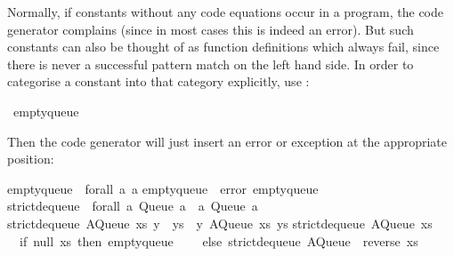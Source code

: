 \begin{isabellebody}
\begin{isamarkuptext}
  Normally, if constants without any code equations occur in a
  program, the code generator complains (since in most cases this is
  indeed an error).  But such constants can also be thought
  of as function definitions which always fail,
  since there is never a successful pattern match on the left hand
  side.  In order to categorise a constant into that category
  explicitly, use \hypertarget{command.code-abort}{\hyperlink{command.code-abort}{\mbox{}}}:%
\end{isamarkuptext}%
\isamarkuptrue%
%
\isadelimquote
%
\endisadelimquote
%
\isatagquote
{}\isamarkupfalse%
\ empty{\isacharunderscore}queue%
\endisatagquote
{\isafoldquote}%
%
\isadelimquote
%
\endisadelimquote
%
\begin{isamarkuptext}%
\noindent Then the code generator will just insert an error or
  exception at the appropriate position:%
\end{isamarkuptext}%
\isamarkuptrue%
%
\isadelimtypewriter
%
\endisadelimtypewriter
%
\isatagtypewriter
%
\begin{isamarkuptext}%
empty{\isacharunderscore}queue\ {\isacharcolon}{\isacharcolon}\ forall\ a{\isachardot}\ a{\isacharsemicolon}\isanewline
empty{\isacharunderscore}queue\ {\isacharequal}\ error\ {\isachardoublequote}empty{\isacharunderscore}queue{\isachardoublequote}{\isacharsemicolon}\isanewline
\isanewline
strict{\isacharunderscore}dequeue\ {\isacharcolon}{\isacharcolon}\ forall\ a{\isachardot}\ Queue\ a\ {\isacharminus}{\isachargreater}\ {\isacharparenleft}a{\isacharcomma}\ Queue\ a{\isacharparenright}{\isacharsemicolon}\isanewline
strict{\isacharunderscore}dequeue\ {\isacharparenleft}AQueue\ xs\ {\isacharparenleft}y\ {\isacharcolon}\ ys{\isacharparenright}{\isacharparenright}\ {\isacharequal}\ {\isacharparenleft}y{\isacharcomma}\ AQueue\ xs\ ys{\isacharparenright}{\isacharsemicolon}\isanewline
strict{\isacharunderscore}dequeue\ {\isacharparenleft}AQueue\ xs\ {\isacharbrackleft}{\isacharbrackright}{\isacharparenright}\ {\isacharequal}\isanewline
\ \ {\isacharparenleft}if\ null\ xs\ then\ empty{\isacharunderscore}queue\isanewline
\ \ \ \ else\ strict{\isacharunderscore}dequeue\ {\isacharparenleft}AQueue\ {\isacharbrackleft}{\isacharbrackright}\ {\isacharparenleft}reverse\ xs{\isacharparenright}{\isacharparenright}{\isacharparenright}{\isacharsemicolon}\isanewline%
\end{isamarkuptext}%
\isamarkuptrue%
%
\endisatagtypewriter
{\isafoldtypewriter}%

\end{isabellebody}
